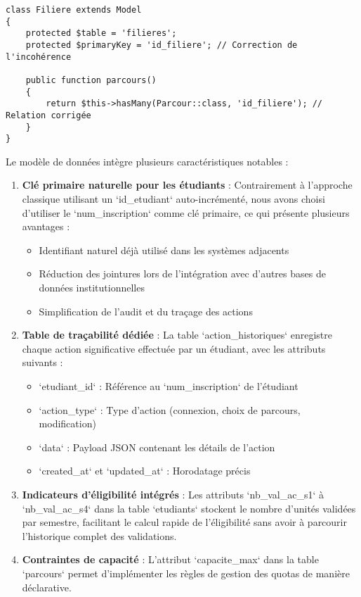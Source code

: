 \documentclass[french,12pt]{report} %
\begin{document}
\begin{lstlisting}[style=phpstyle, caption={Modèle Eloquent corrigé - Filiere.php}]
class Filiere extends Model
{
    protected $table = 'filieres';
    protected $primaryKey = 'id_filiere'; // Correction de l'incohérence
    
    public function parcours()
    {
        return $this->hasMany(Parcour::class, 'id_filiere'); // Relation corrigée
    }
}
\end{lstlisting}

Le modèle de données intègre plusieurs caractéristiques notables :

\begin{enumerate}
    \item \textbf{Clé primaire naturelle pour les étudiants} : Contrairement à l'approche classique utilisant un `id\_etudiant` auto-incrémenté, nous avons choisi d'utiliser le `num\_inscription` comme clé primaire, ce qui présente plusieurs avantages :
    \begin{itemize}
        \item Identifiant naturel déjà utilisé dans les systèmes adjacents
        \item Réduction des jointures lors de l'intégration avec d'autres bases de données institutionnelles
        \item Simplification de l'audit et du traçage des actions
    \end{itemize}
    
    \item \textbf{Table de traçabilité dédiée} : La table `action\_historiques` enregistre chaque action significative effectuée par un étudiant, avec les attributs suivants :
    \begin{itemize}
        \item `etudiant\_id` : Référence au `num\_inscription` de l'étudiant
        \item `action\_type` : Type d'action (connexion, choix de parcours, modification)
        \item `data` : Payload JSON contenant les détails de l'action
        \item `created\_at` et `updated\_at` : Horodatage précis
    \end{itemize}
    
    \item \textbf{Indicateurs d'éligibilité intégrés} : Les attributs `nb\_val\_ac\_s1` à `nb\_val\_ac\_s4` dans la table `etudiants` stockent le nombre d'unités validées par semestre, facilitant le calcul rapide de l'éligibilité sans avoir à parcourir l'historique complet des validations.
    
    \item \textbf{Contraintes de capacité} : L'attribut `capacite\_max` dans la table `parcours` permet d'implémenter les règles de gestion des quotas de manière déclarative.
\end{enumerate}
\end{document}

